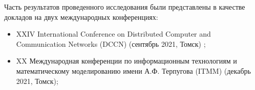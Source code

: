 Часть результатов проведенного исследования были представлены в качестве докладов на двух международных конференциях:
\begin{itemize}
	\item XXIV International Conference on Distributed Computer and Communication Networks (DCCN) (сентябрь 2021, Томск) \cite{blaginin2021approximation};
	\item XX Международная конференции по информационным технологиям и математическому моделированию имени А.Ф. Терпугова (ITMM) (декабрь 2021, Томск);
\end{itemize}

 \clearpage